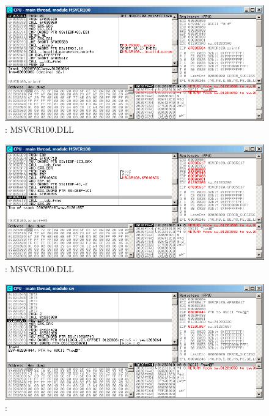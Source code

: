 \begin{figure}[H]
\centering
\includegraphics[scale=\FigScale]{patterns/08_switch/1_few/few_olly6.png}
\caption{\olly:  \printf \InENRU MSVCR100.DLL}
\label{fig:switch_few_olly6}
\end{figure}

\begin{figure}[H]
\centering
\includegraphics[scale=\FigScale]{patterns/08_switch/1_few/few_olly7.png}
\caption{\olly:  \printf \InENRU MSVCR100.DLL}
\label{fig:switch_few_olly7}
\end{figure}

\begin{figure}[H]
\centering
\includegraphics[scale=\FigScale]{patterns/08_switch/1_few/few_olly8.png}
\caption{\olly:  \main}
\label{fig:switch_few_olly8}
\end{figure}

